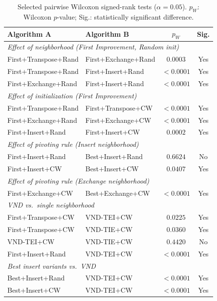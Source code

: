 \documentclass[11pt,a4paper]{article}
\begin{document}
\begin{table}[H]
\centering
\caption{Selected pairwise Wilcoxon signed-rank tests ($\alpha=0.05$).
$p_W$: Wilcoxon $p$-value; Sig.: statistically significant difference.}
\label{tab:pairwise}
\setlength{\tabcolsep}{6pt}
\begin{tabular}{l l c c}
\toprule
\textbf{Algorithm A} & \textbf{Algorithm B} & $p_W$ & \textbf{Sig.} \\
\midrule
\multicolumn{4}{l}{\textit{Effect of neighborhood (First Improvement, Random init)}} \\
First+Transpose+Rand  & First+Exchange+Rand   & $0.0003$ & Yes \\
First+Transpose+Rand  & First+Insert+Rand     & $<0.0001$ & Yes \\
First+Exchange+Rand   & First+Insert+Rand     & $<0.0001$ & Yes \\
\midrule
\multicolumn{4}{l}{\textit{Effect of initialization (First Improvement)}} \\
First+Transpose+Rand  & First+Transpose+CW    & $<0.0001$ & Yes \\
First+Exchange+Rand   & First+Exchange+CW     & $<0.0001$ & Yes \\
First+Insert+Rand     & First+Insert+CW       & $0.0002$  & Yes \\
\midrule
\multicolumn{4}{l}{\textit{Effect of pivoting rule (Insert neighborhood)}} \\
First+Insert+Rand     & Best+Insert+Rand      & $0.6624$ & No \\
First+Insert+CW       & Best+Insert+CW        & $0.0407$ & Yes \\
\midrule
\multicolumn{4}{l}{\textit{Effect of pivoting rule (Exchange neighborhood)}} \\
First+Exchange+CW     & Best+Exchange+CW      & $<0.0001$ & Yes \\
\midrule
\multicolumn{4}{l}{\textit{VND vs.\ single neighborhood}} \\
First+Transpose+CW    & VND-TEI+CW            & $0.0225$  & Yes \\
First+Transpose+CW    & VND-TIE+CW            & $0.0360$  & Yes \\
VND-TEI+CW            & VND-TIE+CW            & $0.4420$  & No  \\
First+Insert+Rand     & VND-TEI+CW            & $<0.0001$ & Yes \\
\midrule
\multicolumn{4}{l}{\textit{Best insert variants vs.\ VND}} \\
Best+Insert+Rand      & VND-TEI+CW            & $<0.0001$ & Yes \\
Best+Insert+CW        & VND-TEI+CW            & $<0.0001$ & Yes \\
\bottomrule
\end{tabular}
\end{table}
\end{document}
